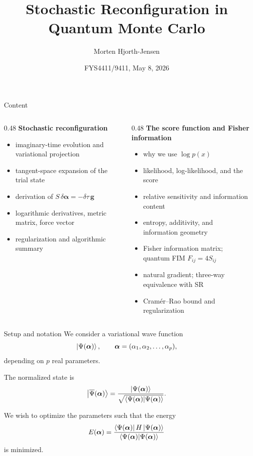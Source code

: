 \documentclass[aspectratio=169]{beamer}
\title{Stochastic Reconfiguration in Quantum Monte Carlo}
\author{Morten Hjorth-Jensen}
\date{FYS4411/9411, May 8, 2026}
\begin{document}
\frame{\titlepage}

\begin{frame}{Content}
\begin{columns}[T]
\begin{column}{0.48\textwidth}
\textbf{Stochastic reconfiguration}
\begin{itemize}
  \item imaginary-time evolution and variational projection
  \item tangent-space expansion of the trial state
  \item derivation of \(S\,\delta\bm{\alpha}=-\delta\tau\,\bm{g}\)
  \item logarithmic derivatives, metric matrix, force vector
  \item regularization and algorithmic summary
\end{itemize}
\end{column}
\begin{column}{0.48\textwidth}
\textbf{The score function and Fisher information}
\begin{itemize}
  \item why we use \(\log p(x)\)
  \item likelihood, log-likelihood, and the score
  \item relative sensitivity and information content
  \item entropy, additivity, and information geometry
  \item Fisher information matrix; quantum FIM \(F_{ij}=4S_{ij}\)
  \item natural gradient; three-way equivalence with SR
  \item Cram\'er--Rao bound and regularization
\end{itemize}
\end{column}
\end{columns}
\end{frame}


\begin{frame}{Setup and notation}
We consider a variational wave function
\[
\ket{\Psi(\bm{\alpha})},
\qquad
\bm{\alpha}=(\alpha_1,\alpha_2,\dots,\alpha_p),
\]
depending on \(p\) real parameters.

\medskip

The normalized state is
\[
\ket{\overline{\Psi}(\bm{\alpha})}
=
\frac{\ket{\Psi(\bm{\alpha})}}
     {\sqrt{\braket{\Psi(\bm{\alpha})}{\Psi(\bm{\alpha})}}}.
\]

We wish to optimize the parameters such that the energy
\[
E(\bm{\alpha})
=
\frac{\bra{\Psi(\bm{\alpha})}H\ket{\Psi(\bm{\alpha})}}
     {\braket{\Psi(\bm{\alpha})}{\Psi(\bm{\alpha})}}
\]
is minimized.
\end{frame}
\end{document}
